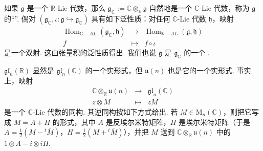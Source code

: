 \begin{numpara}\label{np:lie-1-11-2}
如果 $\mathfrak g$ 是一个 $\mathbb R$-Lie 代数，那么 $\mathfrak g_{\mathbb C}:=\mathbb C\otimes_{\mathbb R}\mathfrak g$ 自然地是一个 $\mathbb C$-Lie 代数，称为 $\mathfrak g$ 的``''. 偶对 $(\mathfrak g_{\mathbb C},\iota:\mathfrak g\hookrightarrow\mathfrak g_{\mathbb C})$ 具有如下泛性质：对任何 $\mathbb C$-Lie 代数 $\mathfrak h$，映射
\[
\begin{array}{rcl}
\operatorname{Hom}_{\mathbb C-AL}(\mathfrak g_{\mathbb C},\mathfrak h) & \longrightarrow & \operatorname{Hom}_{\mathbb R-AL}(\mathfrak g,\mathfrak h)\\
f & \longmapsto & f\circ\iota
\end{array}
\]
是一个双射. 这由张量积的泛性质得出. 我们也说 $\mathfrak g$ 是 $\mathfrak g_{\mathbb C}$ 的一个 .
\begin{example*}
$\mathfrak{gl}_n(\mathbb R)$ 显然是 $\mathfrak{gl}_n(\mathbb C)$ 的一个实形式，但 $\mathfrak u(n)$ 也是它的一个实形式. 事实上，映射
\[
\begin{array}{rcl}
\mathbb C\otimes_{\mathbb R}\mathfrak u(n) & \longrightarrow & \mathfrak{gl}_n(\mathbb C)\\
z\otimes M & \longmapsto & zM
\end{array}
\]
是一个 $\mathbb C$-Lie 代数的同构. 其逆同构按如下方式给出. 若 $M\in\mathrm{M}_n(\mathbb C)$，则把它写成 $M=A+H$ 的形式，其中 $A$ 是反埃尔米特矩阵，$H$ 是埃尔米特矩阵（于是 $A=\frac{1}{2}(M-{}^{t}\bar M)$，$H=\frac{1}{2}(M+{}^{t}\bar M)$），并把 $M$ 送到 $\mathbb C\otimes_{\mathbb R}\mathfrak u(n)$ 中的 $1\otimes A-i\otimes iH$.
\end{example*}
\end{numpara}

